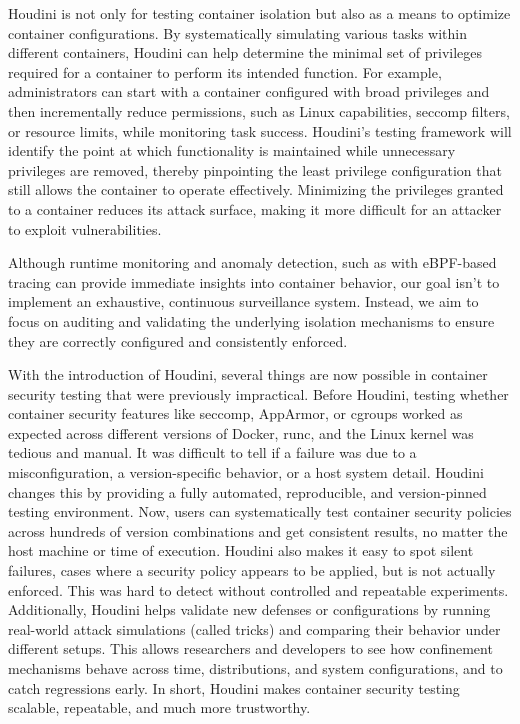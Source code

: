 \documentclass[12pt]{report}
\begin{document}
\begin{doublespace}
Houdini is not only for testing container isolation but also as a means to optimize container configurations. By systematically simulating various tasks within different containers, Houdini can help determine the minimal set of privileges required for a container to perform its intended function. For example, administrators can start with a container configured with broad privileges and then incrementally reduce permissions, such as Linux capabilities, seccomp filters, or resource limits, while monitoring task success. Houdini’s testing framework will identify the point at which functionality is maintained while unnecessary privileges are removed, thereby pinpointing the least privilege configuration that still allows the container to operate effectively. Minimizing the privileges granted to a container reduces its attack surface, making it more difficult for an attacker to exploit vulnerabilities.

Although runtime monitoring and anomaly detection, such as with eBPF-based tracing \cite{findlay2021bpfcontain} can provide immediate insights into container behavior, our goal isn't to implement an exhaustive, continuous surveillance system. Instead, we aim to focus on auditing and validating the underlying isolation mechanisms to ensure they are correctly configured and consistently enforced.

With the introduction of Houdini, several things are now possible in container security testing that were previously impractical. Before Houdini, testing whether container security features like seccomp, AppArmor, or cgroups worked as expected across different versions of Docker, runc, and the Linux kernel was tedious and manual. It was difficult to tell if a failure was due to a misconfiguration, a version-specific behavior, or a host system detail. Houdini changes this by providing a fully automated, reproducible, and version-pinned testing environment. Now, users can systematically test container security policies across hundreds of version combinations and get consistent results, no matter the host machine or time of execution. Houdini also makes it easy to spot silent failures, cases where a security policy appears to be applied, but is not actually enforced. This was hard to detect without controlled and repeatable experiments. Additionally, Houdini helps validate new defenses or configurations by running real-world attack simulations (called tricks) and comparing their behavior under different setups. This allows researchers and developers to see how confinement mechanisms behave across time, distributions, and system configurations, and to catch regressions early. In short, Houdini makes container security testing scalable, repeatable, and much more trustworthy.


\end{doublespace}
\end{document}
